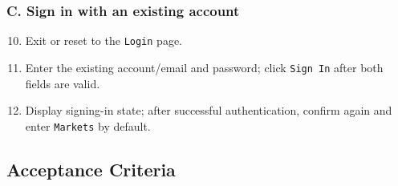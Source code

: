 \subsubsection{C. Sign in with an existing account}
\begin{enumerate}
\setcounter{enumi}{9}
\item Exit or reset to the \texttt{Login} page.
\item Enter the existing account/\allowbreak{}email and password; click \texttt{Sign In} after both fields are valid.
\item Display signing-in state; after successful authentication, confirm again and enter \texttt{Markets} by default.
\end{enumerate}
\subsection{Acceptance Criteria}
\begingroup
\small
